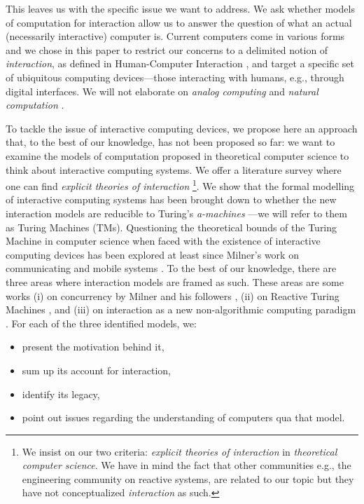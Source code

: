 \documentclass[a4paper, 11pt, twoside]{article}
\begin{document}
This leaves us with the specific issue we want to address. We ask whether models of computation for interaction allow us to answer the question of what an actual (necessarily interactive) computer is. Current computers come in various forms and we chose in this paper to restrict our concerns to a delimited notion of \textit{interaction}, as defined in Human-Computer Interaction \parencite{Myers1994, Dearden1997, Beaudouin-Lafon2006,  Hornbaek2017, Basman2018}, and target a specific set of ubiquitous computing devices---those interacting with humans, e.g., through digital interfaces. We will not elaborate on \textit{analog computing} \parencite{Bielecki2019} and \textit{natural computation} \parencite{Dodig-Crnkovic2011, MacLennan2003}. 

To tackle the issue of interactive computing devices, we propose here an approach that, to the best of our knowledge, has not been proposed so far: we want to examine the models of computation proposed in theoretical computer science to think about interactive computing systems. We offer a literature survey where one can find \textit{explicit theories of interaction} \footnote{We insist on our two criteria: \textit{explicit theories of interaction} in \textit{theoretical computer science}. We have in mind the fact that other communities e.g., the engineering community on reactive systems, are related to our topic but they have not conceptualized \textit{interaction} as such.}. We show that the formal modelling of interactive computing systems has been brought down to whether the new interaction models are reducible to Turing’s \emph{a-machines} \parencite{Turing1937}---we will refer to them as Turing Machines (TMs). 
Questioning the theoretical bounds of the Turing Machine in computer science when faced with the existence of interactive computing devices has been explored at least since Milner's work on communicating and mobile systems \parencite{Milner1993, Milner1999}. To the best of our knowledge, there are three areas where interaction models are framed as such. These areas are some works (i) on concurrency by Milner and his followers \parencite{Milner1999, Milner2006}, (ii) on Reactive Turing Machines \parencite{Andersen1997, Baeten2013, VanLeeuwen2001, VanLeeuwen2006}, and (iii) on interaction as a new non-algorithmic computing paradigm \parencite{Goldin2006, Wegner1997, Wegner2003}. For each of the three identified models, we:

\begin{itemize}
    \item present the motivation behind it, 
    \item sum up its account for interaction,
    \item identify its legacy,
    \item point out issues regarding the understanding of computers qua that model.
\end{itemize}
\end{document}
